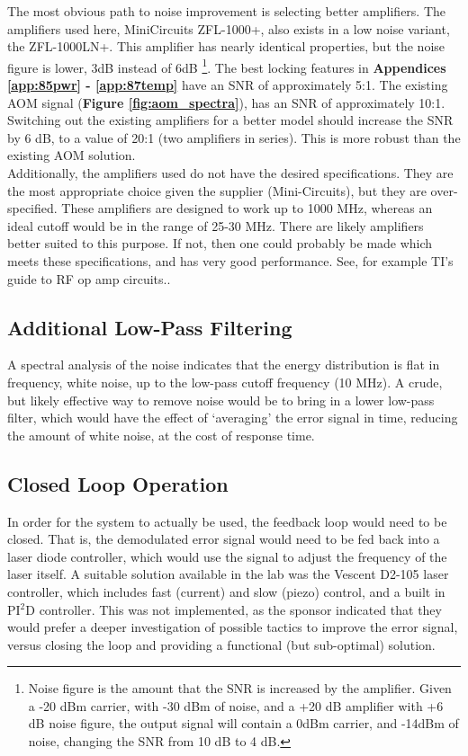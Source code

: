 The most obvious path to noise improvement is selecting better amplifiers.  The amplifiers used here, MiniCircuits ZFL-1000+, also exists in a low noise variant, the ZFL-1000LN+.  This amplifier has nearly identical properties, but the noise figure is lower, 3dB instead of 6dB \footnote{Noise figure is the amount that the SNR is increased by the amplifier.  Given a -20 dBm carrier, with -30 dBm of noise, and a +20 dB amplifier with +6 dB noise figure, the output signal will contain a 0dBm carrier, and -14dBm of noise, changing the SNR from 10 dB to 4 dB.}. The best locking features in \textbf{Appendices \ref{app:85pwr} - \ref{app:87temp}} have an SNR of approximately 5:1. The existing AOM signal (\textbf{Figure \ref{fig:aom_spectra}}), has an SNR of approximately 10:1. Switching out the existing amplifiers for a better model should increase the SNR by 6 dB, to a value of 20:1 (two amplifiers in series). This is more robust than the existing AOM solution. \\

Additionally, the amplifiers used do not have the desired specifications.  They are the most appropriate choice given the supplier (Mini-Circuits), but they are over-specified.  These amplifiers are designed to work up to 1000 MHz, whereas an ideal cutoff would be in the range of 25-30 MHz.  There are likely amplifiers better suited to this purpose.  If not, then one could probably be made which meets these specifications, and has very good performance.  See, for example TI's guide to RF op amp circuits.\cite{ti_amps}.

\subsection{Additional Low-Pass Filtering}

A spectral analysis of the noise indicates that the energy distribution is flat in frequency, white noise, up to the low-pass cutoff frequency (10 MHz).  A crude, but likely effective way to remove noise would be to bring in a lower low-pass filter, which would have the effect of `averaging' the error signal in time, reducing the amount of white noise, at the cost of response time.


\subsection{Closed Loop Operation}

In order for the system to actually be used, the feedback loop would need to be closed.  That is, the demodulated error signal would need to be fed back into a laser diode controller, which would use the signal to adjust the frequency of the laser itself.  A suitable solution available in the lab was the Vescent D2-105 laser controller, which includes fast (current) and slow (piezo) control, and a built in PI$^2$D controller.  This was not implemented, as the sponsor indicated that they would prefer a deeper investigation of possible tactics to improve the error signal, versus closing the loop and providing a functional (but sub-optimal) solution.


